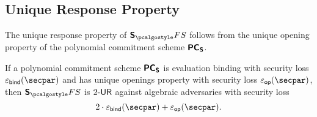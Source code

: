 \subsection{Unique Response Property}
The unique response property of $\sonicprotfs$ follows from the unique opening
property of the polynomial commitment scheme $\bm{\mathsf{PC}}_{\bm{\mathsf{S}}}$.
\begin{lemma}
\label{lem:sonicprot_ur}
If a polynomial commitment scheme $\bm{\mathsf{PC}}_{\bm{\mathsf{S}}}$ is evaluation binding with security loss $\epsbind (\secpar)$ and has unique openings property with security loss $\epsop(\secpar)$, then $\sonicprotfs$ is ${2\text{-}\mathsf{UR}}$ against algebraic adversaries with security loss
  \[
    2 \cdot \epsbinding (\secpar) + \epsop (\secpar).
  \]
\end{lemma}


